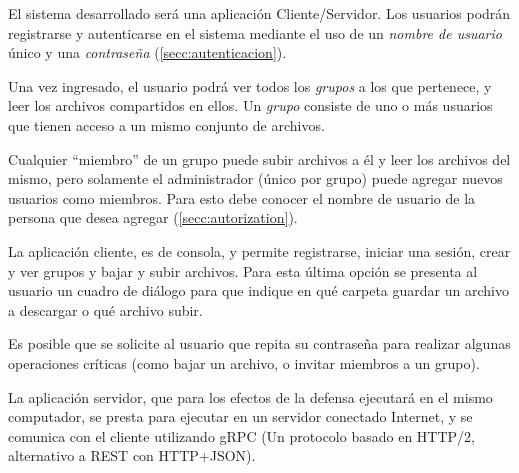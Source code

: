 El sistema desarrollado será una aplicación Cliente/Servidor. 
Los usuarios podrán registrarse y autenticarse en el sistema mediante
el uso de un \emph{nombre de usuario} único y una \emph{contraseña}
(\autoref{secc:autenticacion}).

Una vez ingresado, el usuario podrá ver todos los \emph{grupos} a los
que pertenece, y leer los archivos compartidos en ellos. Un \emph{grupo} 
consiste de uno o más usuarios que tienen acceso a un mismo conjunto de archivos.

Cualquier ``miembro'' de un grupo puede subir archivos a él y leer los archivos
del mismo, pero solamente el administrador (único por grupo) puede agregar
nuevos usuarios como miembros. Para esto debe conocer el nombre de usuario
de la persona que desea agregar (\autoref{secc:autorization}).

La aplicación cliente, es de consola, y permite registrarse, iniciar una sesión, 
crear y ver grupos y bajar y subir archivos.
Para esta última opción se presenta al usuario un cuadro de diálogo para que
indique en qué carpeta guardar un archivo a descargar o qué archivo subir.

Es posible que se solicite al usuario que repita su contraseña para realizar
algunas operaciones críticas (como bajar un archivo, o invitar miembros a un
grupo).

La aplicación servidor, que para los efectos de la defensa ejecutará en el
mismo computador, se presta para ejecutar en un servidor conectado Internet, y
se comunica con el cliente utilizando gRPC (Un protocolo basado en HTTP/2,
alternativo a REST con HTTP+JSON).

